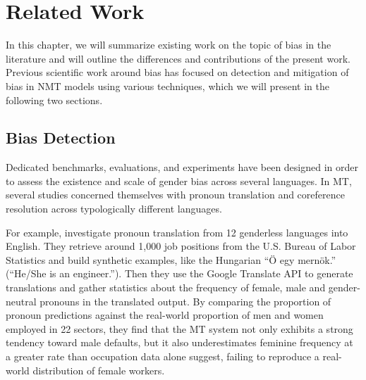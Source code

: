 \chapter{Related Work}
\label{ch:Related_work}



In this chapter, we will summarize existing work on the topic of bias in the literature and will outline the differences and contributions of the present work. Previous scientific work around bias has focused on detection and mitigation of bias in NMT models using various techniques, which we will present in the following two sections.  %

\section{Bias Detection}
\label{sec:Background:Bias_Detection}

Dedicated benchmarks, evaluations, and experiments have been designed in order to assess the existence and scale of gender bias across several languages. In MT, several studies concerned themselves with pronoun translation and coreference resolution across typologically different languages. 

For example, \citet{Prates_2019} investigate pronoun translation from 12 genderless languages into English. They retrieve around 1,000 job positions from the U.S. Bureau of Labor Statistics and build synthetic examples, like the Hungarian “Ö egy mernök.” (“He/She is an engineer.”). Then they use the Google Translate API to generate translations and gather statistics about the frequency of female, male and gender-neutral pronouns in the translated output. By comparing the proportion of pronoun predictions against the real-world proportion of men and women employed in 22 sectors, they find that the MT system not only exhibits a strong tendency toward male defaults, but it also underestimates feminine frequency at a greater rate than occupation data alone suggest, failing to reproduce a real-world distribution of female workers.

